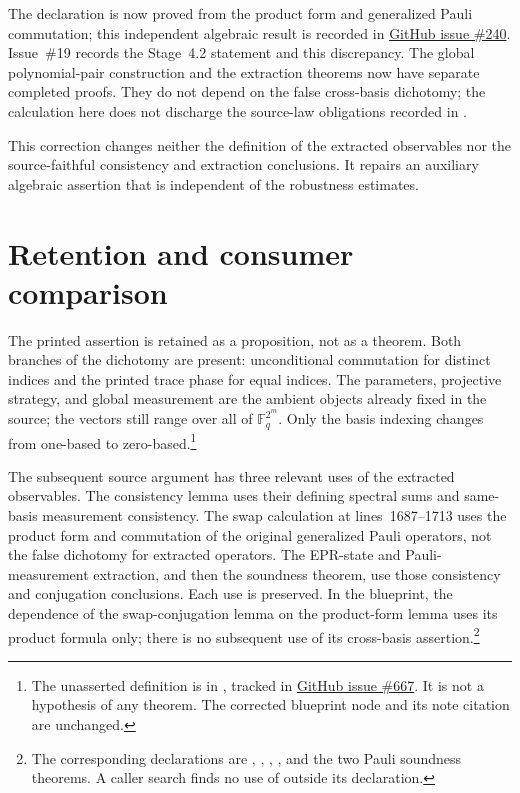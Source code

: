 \documentclass[11pt]{article}
\renewcommand{\ghissue}[1]{%
  \href{https://github.com/Dengnifer/MIPStarRE-QPBT/issues/#1}{GitHub issue \##1}}
\begin{document}
The declaration is now proved from the product form and generalized Pauli
commutation; this independent algebraic result is recorded in \ghissue{240}.
Issue~\#19 records the Stage~4.2 statement and this discrepancy. The
global polynomial-pair construction and the extraction theorems now have
separate completed proofs. They do not depend on the false cross-basis
dichotomy; the calculation here does not discharge the source-law obligations
recorded in .

This correction changes neither the definition of the extracted observables
nor the source-faithful consistency and extraction conclusions.  It repairs an
auxiliary algebraic assertion that is independent of the robustness estimates.

\section{Retention and consumer comparison}

The printed assertion is retained as a proposition, not as a theorem.  Both
branches of the dichotomy are present: unconditional commutation for distinct
indices and the printed trace phase for equal indices.  The parameters,
projective strategy, and global measurement are the ambient objects already
fixed in the source; the vectors still range over all of $\mathbb F_q^{2^m}$.
Only the basis indexing changes from one-based to zero-based.\footnote{The
unasserted definition is
 in
, tracked in
\ghissue{667}.  It is not a hypothesis of any theorem.  The corrected
blueprint node and its note citation are unchanged.}

The subsequent source argument has three relevant uses of the extracted
observables.  The consistency lemma uses their defining spectral sums and
same-basis measurement consistency.  The swap calculation at lines~1687--1713
uses the product form and commutation of the original generalized Pauli
operators, not the false dichotomy for extracted operators.  The EPR-state and
Pauli-measurement extraction, and then the soundness theorem, use those
consistency and conjugation conclusions.  Each use is preserved.  In the
blueprint, the dependence of the swap-conjugation lemma on the product-form
lemma uses its product formula only; there is no subsequent use of its
cross-basis assertion.\footnote{The corresponding declarations are
,
, ,
, and the two Pauli soundness theorems.
A caller search finds no use of  outside
its declaration.}
\end{document}
